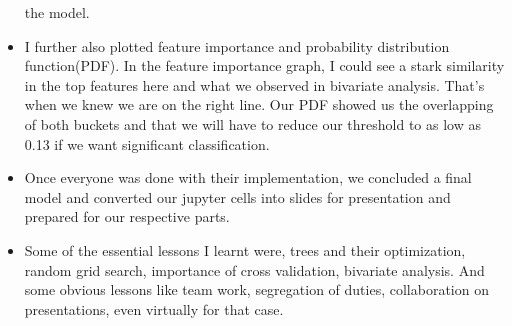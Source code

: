 \documentclass[
]{article}
\begin{document}
\begin{itemize}
  the model.
\item
  I further also plotted feature importance and probability distribution
  function(PDF). In the feature importance graph, I could see a stark
  similarity in the top features here and what we observed in bivariate
  analysis. That's when we knew we are on the right line. Our PDF showed
  us the overlapping of both buckets and that we will have to reduce our
  threshold to as low as 0.13 if we want significant classification.
\item
  Once everyone was done with their implementation, we concluded a final
  model and converted our jupyter cells into slides for presentation and
  prepared for our respective parts.
\item
  Some of the essential lessons I learnt were, trees and their
  optimization, random grid search, importance of cross validation,
  bivariate analysis. And some obvious lessons like team work,
  segregation of duties, collaboration on presentations, even virtually
  for that case.
\end{itemize}
\end{document}

